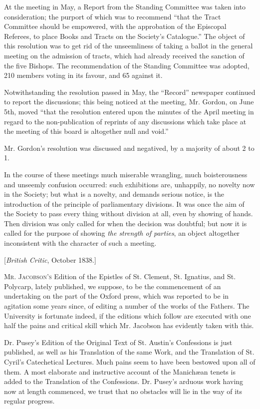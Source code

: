 At the meeting in May, a Report from the Standing
Committee was taken into consideration; the purport of which was to
recommend ``that the Tract Committee should be empowered, with the
approbation of the Episcopal Referees, to place Books and Tracts on the
Society's Catalogue.'' The object of this resolution was to get rid of
the unseemliness of taking a ballot in the general meeting on the
admission of tracts, which had already received the sanction of the five
Bishops. The recommendation of the Standing Committee was adopted, 210
members voting in its favour, and 65 against it.

Notwithstanding the resolution passed in May, the ``Record''
newspaper continued to report the discussions; this being noticed at the
meeting, Mr. Gordon, on June 5th, moved ``that the resolution entered
upon the minutes of the April meeting in regard to the
non-publication of reprints of any discussions which take place at the
meeting of this board is altogether null and void.''

Mr. Gordon's resolution was discussed and negatived,
by a majority of about 2 to 1.

In the course of these meetings much miserable
wrangling, much boisterousness and unseemly confusion occurred: such
exhibitions are, unhappily, no novelty now in the Society; but what is a
novelty, and demands serious notice, is the introduction of the
principle of parliamentary divisions. It was once the aim of the Society
to pass every thing without division at all, even by showing of hands.
Then division was only called for when the decision was doubtful; but
now it is called for the purpose of showing \emph{the strength of parties},
an object altogether inconsistent with the character of such a meeting.


[\emph{British Critic}, October 1838.]

M\textsc{r}. J\textsc{acobson's}
Edition of the Epistles of St. Clement, St. Ignatius, and St. Polycarp,
lately published, we suppose, to be the commencement of an undertaking
on the part of the Oxford press, which was reported to be in agitation
some years since, of editing a number of the works of the Fathers. The
University is fortunate indeed, if the editions which follow are
executed with one half the pains and critical skill which Mr. Jacobson
has evidently taken with this.

Dr. Pusey's Edition of the Original Text of St.
Austin's Confessions is just published, as well as his Translation of
the same Work, and the Translation of St. Cyril's Catechetical Lectures.
Much pains seem to have been bestowed upon all of them. A most elaborate
and instructive account of the Manichæan tenets is added to the
Translation of the Confessions. Dr. Pusey's arduous work having now at
length commenced, we trust that no obstacles will lie in the way of its
regular progress.

